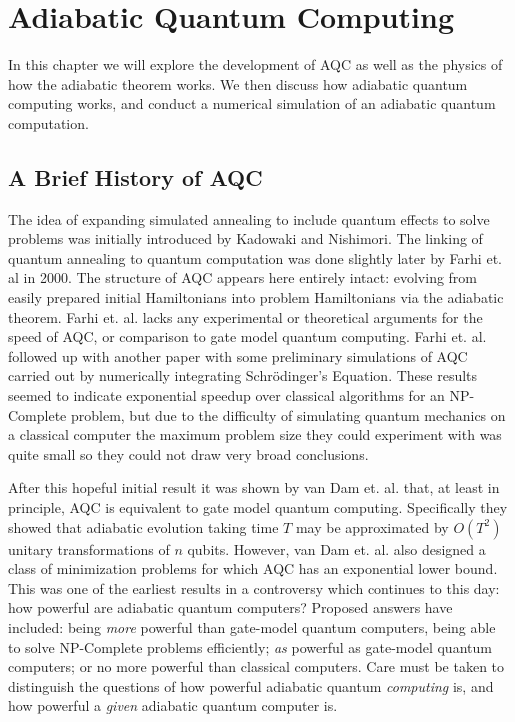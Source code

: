 \chapter{Adiabatic Quantum Computing}
\label{chap:aqc}

In this chapter we will explore the development of AQC as well as the physics of how the adiabatic theorem works.  We then discuss how adiabatic quantum computing works, and conduct a numerical simulation of an adiabatic quantum computation.

\section{A Brief History of AQC}
The idea of expanding simulated annealing to include quantum effects to solve problems was initially introduced by Kadowaki and Nishimori.\cite{transverse}  The linking of quantum annealing to quantum computation was done slightly later by Farhi et. al in 2000.\cite{farhi}  The structure of AQC appears here entirely intact: evolving from easily prepared initial Hamiltonians into problem Hamiltonians via the adiabatic theorem.  Farhi et. al.\cite{farhi} lacks any experimental or theoretical arguments for the speed of AQC, or comparison to gate model quantum computing.  Farhi et. al. followed up with another paper\cite{farhi2} with some preliminary simulations of AQC carried out by numerically integrating Schr\"odinger's Equation.  These results seemed to indicate exponential speedup over classical algorithms for an NP-Complete problem, but due to the difficulty of simulating quantum mechanics on a classical computer the maximum problem size they could experiment with was quite small so they could not draw very broad conclusions.

After this hopeful initial result it was shown by van Dam et. al.\cite{vandam} that, at least in principle, AQC is equivalent to gate model quantum computing.  Specifically they showed that adiabatic evolution taking time $T$ may be approximated by $O(T^2)$ unitary transformations of $n$ qubits.  However, van Dam et. al. also designed a class of minimization problems for which AQC has an exponential lower bound.  This was one of the earliest results in a controversy which continues to this day: how powerful are adiabatic quantum computers?  Proposed answers have included: being \emph{more} powerful than gate-model quantum computers, being able to solve NP-Complete problems efficiently;\cite{geordie}\cite{google} \emph{as} powerful as gate-model quantum computers;\cite{vandam} or no more powerful than classical computers.\cite{speedup}  Care must be taken to distinguish the questions of how powerful adiabatic quantum \emph{computing} is, and how powerful a \emph{given} adiabatic quantum computer is.

